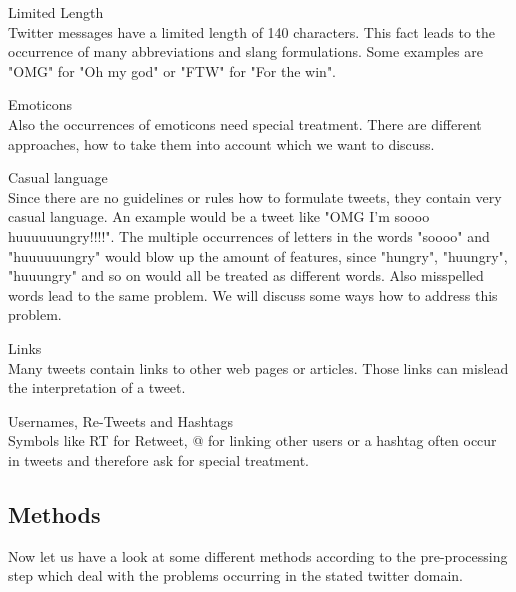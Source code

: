 \documentclass{sig-alternate}
\begin{document}
\begin{itemize}
\begin{item}
Limited Length\\
Twitter messages have a limited length of 140 characters. This fact leads to the occurrence of many abbreviations and slang formulations. Some examples are "OMG" for "Oh my god" or "FTW" for "For the win".
\end{item}


\begin{item}
Emoticons\\
Also the occurrences of emoticons need special treatment. There are different approaches, how to take them into account which we want to discuss.
\end{item}

\begin{item}
Casual language\\
Since there are no guidelines or rules how to formulate tweets, they contain very casual language. An example would be a tweet like "OMG I'm soooo huuuuuungry!!!!". The multiple occurrences of letters in the words "soooo" and "huuuuuungry" would blow up the amount of features, since "hungry", "huungry", "huuungry" and so on would all be treated as different words. Also misspelled words lead to the same problem. We will discuss some ways how to address this problem.
\end{item}

\begin{item}
Links\\
Many tweets contain links to other web pages or articles. Those links can mislead the interpretation of a tweet.
\end{item}

\begin{item}
Usernames, Re-Tweets and Hashtags\\
Symbols like RT for Retweet, @ for linking other users or a hashtag often occur in tweets and therefore ask for special treatment.
\end{item}
\end{itemize}

\subsection{Methods}
Now let us have a look at some different methods according to the pre-processing step which deal with the problems occurring in the stated twitter domain.
\end{document}
